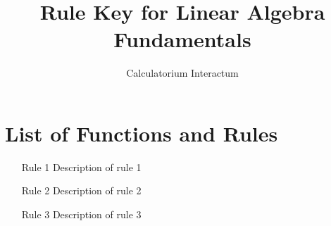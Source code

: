 \documentclass{article}
\title{Rule Key for Linear Algebra Fundamentals}
\author{Calculatorium Interactum}
\begin{document}
\maketitle

\section{List of Functions and Rules}

\begin{enumerate}
    \item [Rule 1] Description of rule 1
    \item [Rule 2] Description of rule 2
    \item [Rule 3] Description of rule 3
\end{enumerate}
\end{document}
